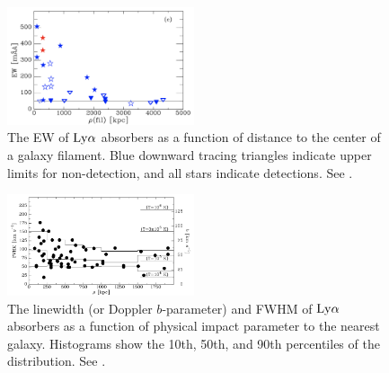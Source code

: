 \documentclass[twocolumn,tighten]{aastex62}
\begin{document}
\begin{figure}[ht!]
        \centering
        \vspace{0pt}
        \includegraphics[width=0.49\textwidth]{Wakker2015_filament_EW.png}
        \caption{\small{The EW of $\rm Ly\alpha$ absorbers as a function of distance to the center of a galaxy filament. Blue downward tracing triangles indicate upper limits for non-detection, and all stars indicate detections. See \cite{wakker2015}.}}
        \vspace{5pt}
        \label{wakker_filament}
\end{figure}

\begin{figure}[ht!]
        \centering
        \vspace{0pt}
        \includegraphics[width=0.49\textwidth]{bart_moneyplot.png}
        \caption{\small{The linewidth (or Doppler $b$-parameter) and FWHM of $\rm Ly\alpha$ absorbers as a function of physical impact parameter to the nearest galaxy. Histograms show the 10th, 50th, and 90th percentiles of the distribution.  See \cite{wakker2009}.}}
        \vspace{5pt}
        \label{wakker2009_linewidth}
\end{figure}
\end{document}

